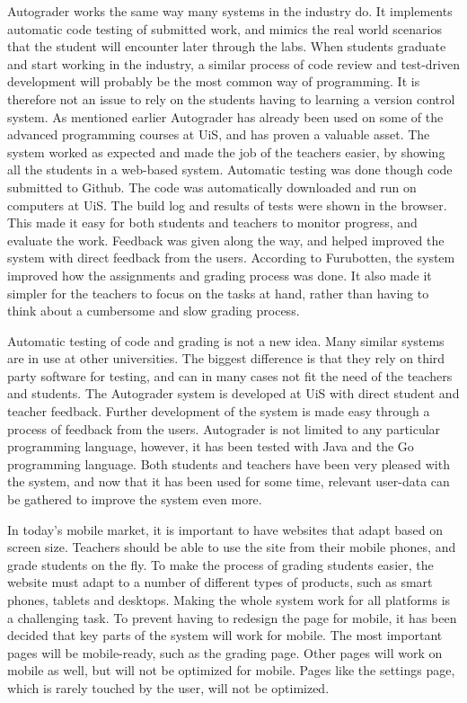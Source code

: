 Autograder works the same way many systems in the industry do. It implements automatic code testing of submitted work, and mimics the real world scenarios that the student will encounter later through the labs. When students graduate and start working in the industry, a similar process of code review and test-driven development will probably be the most common way of programming. It is therefore not an issue to rely on the students having to learning a version control system. As mentioned earlier Autograder has already been used on some of the advanced programming courses at UiS, and has proven a valuable asset. The system worked as expected and made the job of the teachers easier, by showing all the students in a web-based system. Automatic testing was done though code submitted to Github. The code was automatically downloaded and run on computers at UiS. The build log and results of tests were shown in the  browser. This made it easy for both students and teachers to monitor progress, and evaluate the work. Feedback was given along the way, and helped improved the system with direct feedback from the users. According to Furubotten, the system improved how the assignments and grading process was done. It also made it simpler for the teachers to focus on the tasks at hand, rather than having to think about a cumbersome and slow grading process. 

Automatic testing of code and grading is not a new idea. Many similar systems are in use at other universities. The biggest difference is that they rely on third party software for testing, and can in many cases not fit the need of the teachers and students. The Autograder system is developed at UiS with direct student and teacher feedback. Further development of the system is made easy through a process of feedback from the users. Autograder is not limited to any particular programming language, however, it has been tested with Java and the Go programming language. Both students and teachers have been very pleased with the system, and now that it has been used for some time, relevant user-data can be gathered to improve the system even more.

In today's mobile market, it is important to have websites that adapt based on screen size. Teachers should be able to use the site from their mobile phones, and grade students on the fly. To make the process of grading students easier, the website must adapt to a number of different types of products, such as smart phones, tablets and desktops. Making the whole system work for all platforms is a challenging task. To prevent having to redesign the page for mobile, it has been decided that key parts of the system will work for mobile. The most important pages will be mobile-ready, such as the grading page. Other pages will work on mobile as well, but will not be optimized for mobile. Pages like the settings page, which is rarely touched by the user, will not be optimized.

